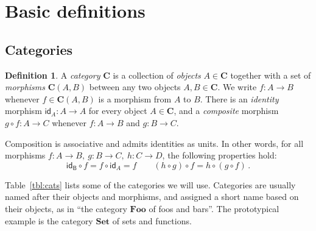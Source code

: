 \documentclass[draft,11pt]{report}
\theoremstyle{definition}
\newtheorem{definition}[theorem]{Definition}
\newcommand{\kw}[1]{\ensuremath{ \mathsf{#1} }}
\begin{document}

\section{Basic definitions} %

\subsection{Categories} %

\begin{definition} %
A \emph{category} $\mathbf{C}$
is a collection of \emph{objects} $A \in \mathbf{C}$
together with a set of \emph{morphisms} $\mathbf{C}(A,B)$
between any two objects $A, B \in \mathbf{C}$.
We write $f : A \rightarrow B$
whenever $f \in \mathbf{C}(A,B)$ is a morphism from $A$ to $B$.
There is an \emph{identity} morphism $\kw{id}_A : A \rightarrow A$
for every object $A \in \mathbf{C}$,
and a \emph{composite} morphism $g \circ f : A \rightarrow C$
whenever $f : A \rightarrow B$ and $g : B \rightarrow C$.

Composition is associative
and admits identities as units.
In other words,
for all morphisms
$f : A \rightarrow B, \:
 g : B \rightarrow C, \:
 h : C \rightarrow D$,
the following properties hold:
\[
  \kw{id_B} \circ f = f \circ \kw{id}_A = f
  \qquad
  (h \circ g) \circ f = h \circ (g \circ f)
  \,.
\]
\end{definition}

Table~\ref{tbl:cats} lists some of the categories we will use.
Categories are usually named after their objects and morphisms,
and assigned a short name based on their objects,
as in ``the category $\mathbf{Foo}$ of foos and bars''.
The prototypical example is the category $\mathbf{Set}$
of sets and functions.
\end{document}
